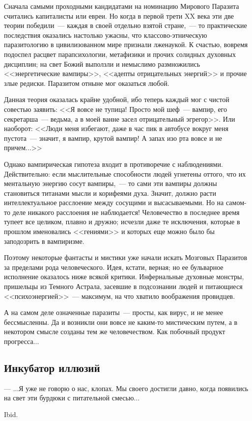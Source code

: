 \documentclass{scrbook}
\makeatletter
\newcommand{\defaultepigraphwidth}{0.5} %
\newcommand{\flqq}{<<}
\newcommand{\frqq}{>>}
\newcommand{\mdash}{~--- }
\newcommand{\sdash}{--- } %
\newcommand{\commamdash}{~--- } %
\newcommand{\essaysection}[1]{\subsection*{#1}\nopagebreak}
\newcommand{\myepigraph}[3][\@empty]{
	\ifx\@empty#1
		\setlength{\epigraphwidth}{\defaultepigraphwidth\textwidth}
	\else
		\setlength{\epigraphwidth}{#1\textwidth}
	\fi
	\epigraph{#2}{#3}
	\setlength{\epigraphwidth}{\defaultepigraphwidth\textwidth} %
	\nopagebreak
}
\makeatother
\begin{document}
Сначала самыми проходными кандидатами на номинацию Мирового Паразита считались капиталисты или евреи. Но когда в первой трети XX века эти две теории победили{\mdash}каждая в своей отдельно взятой стране,{\commamdash}то практические последствия оказались настолько ужасны, что классово-этническую паразитологию в цивилизованном мире признали лженаукой. К счастью, вовремя подоспел расцвет парапсихологии, метафизики и прочих солидных духовных дисциплин; на свет Божий выползли и немыслимо размножились {\flqq}энергетические вампиры{\frqq}, {\flqq}адепты отрицательных энергий{\frqq} и прочие злые редиски. Паразитом отныне мог оказаться любой.

Данная теория оказалась крайне удобной, ибо теперь каждый мог с чистой совестью заявить: {\flqq}Я вовсе не тупица! Просто мой шеф{\mdash}вампир, его секретарша{\mdash}ведьма, а в моей ванне засел отрицательный эгрегор{\frqq}. Или наоборот: {\flqq}Люди меня избегают, даже в час пик в автобусе вокруг меня пустота{\mdash}значит, я вампир, крутой вампир! А запах изо рта вовсе и не причем...{\frqq}

Однако вампирическая гипотеза входит в противоречие с наблюдениями. Действительно: если мыслительные способности людей угнетены оттого, что их ментальную энергию сосут вампиры,{\commamdash}то сами эти вампиры должны становиться титанами мысли и корифеями духа. Значит, должно расти интеллектуальное расслоение между сосущими и высасываемыми. Но на самом-то деле никакого расслоения не наблюдается! Человечество в последнее время тупеет все целиком, плавно и дружно; исчезли даже те исключения, которые в прошлом именовались {\flqq}гениями{\frqq} и которых еще можно было бы заподозрить в вампиризме.

Поэтому некоторые фантасты и мистики уже начали искать Мозговых Паразитов за пределами рода человеческого. Идея, кстати, верная; но ее бульварное исполнение оказалось ниже всякой критики. Инфернальные духовные монстры, пришельцы из Темного Астрала, засевшие в подсознании людей и питающиеся {\flqq}психоэнергией{\frqq}{\mdash}максимум, на что хватило воображения провидцев.

А на самом деле означенные паразиты{\mdash}просты, как вирус, и не менее бессмысленны. Да и возникли они вовсе не каким-то мистическим путем, а в некотором смысле созданы тем же человечеством. Как побочный продукт прогресса...

\essaysection{Инкубатор иллюзий}

\myepigraph{{\sdash} ...Я уже не говорю о нас, клопах. Мы своего достигли давно, когда появились на свет эти бурдюки с питательной смесью...}
{Ibid.}
\end{document}
